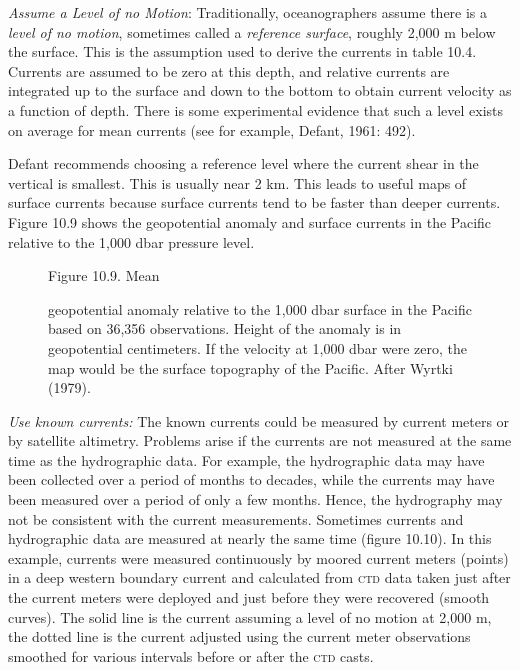 \begin{enumerate}
\vitem \textit{Assume a Level of no Motion}: Traditionally, oceanographers assume there
is a \textit{\textit{level of no motion}}, sometimes
called a \textit{\textit{reference surface}}, roughly 2,000 m below the surface. This is
the assumption used to derive the currents in table 10.4. Currents are assumed to be
zero at this depth, and relative currents are integrated up to the surface and down to
the bottom to obtain current velocity as a function of depth. There is some experimental
evidence that such a level exists on average for mean currents (see for example, Defant,
1961: 492).

Defant recommends choosing a reference level where the current shear in the vertical is
smallest. This is usually near 2 km. This leads to useful maps of surface currents
because surface currents tend to be faster than deeper currents. Figure 10.9 shows the
geopotential anomaly and surface currents in the Pacific relative to the 1,000 dbar
pressure level.

\begin{figure}[t!]
\footnotesize
Figure 10.9. Mean \rule{0mm}{4ex}geopotential anomaly relative to the 1,000
dbar surface in the Pacific based on 36,356 observations. Height of the anomaly is in
geopotential centimeters. If the velocity at 1,000 dbar were zero, the map would be the
surface topography of the Pacific. After Wyrtki (1979).
\label{fig:wyrtkiplot}
\vspace{-4ex}
\end{figure}

\vitem \textit{Use known currents:} The known currents could be measured by
current meters or by satellite altimetry. Problems arise if the currents are not
measured at the same time as the hydrographic data. For example, the hydrographic data may have been collected over a period of months
to decades, while the currents may have been measured over a period of only a few months.
Hence, the hydrography may not be consistent with the current measurements.
Sometimes currents and hydrographic data are measured at nearly the same
time (figure 10.10). In this example, currents were measured continuously
by moored current meters (points) in a deep western boundary current and calculated from
\textsc{ctd} data taken just after the current meters were deployed and just before
they were recovered (smooth curves). The solid line is the current assuming a level
of no motion at 2,000 m, the dotted line is the current adjusted using the current
meter observations smoothed for various intervals before or after the \textsc{ctd}
casts.


\end{enumerate}

